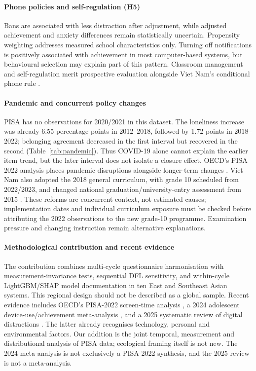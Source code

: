 \documentclass[preprint,12pt,authoryear,nonatbib]{elsarticle}
\let\citep\parencite
\begin{document}
\paragraph{Phone policies and self-regulation (H5)} Bans are associated with less distraction after adjustment, while adjusted achievement and anxiety differences remain statistically uncertain. Propensity weighting addresses measured school characteristics only. Turning off notifications is positively associated with achievement in most computer-based systems, but behavioural selection may explain part of this pattern. Classroom management and self-regulation merit prospective evaluation alongside Viet Nam's conditional phone rule \citep{moet2020circular32}.

\paragraph{Pandemic and concurrent policy changes} PISA has no observations for 2020/2021 in this dataset. The loneliness increase was already 6.55 percentage points in 2012--2018, followed by 1.72 points in 2018--2022; belonging agreement decreased in the first interval but recovered in the second (Table~\ref{tab:pandemic}). Thus COVID-19 alone cannot explain the earlier item trend, but the later interval does not isolate a closure effect. OECD's PISA 2022 analysis places pandemic disruptions alongside longer-term changes \citep{oecd2023vol2}. Viet Nam also adopted the 2018 general curriculum, with grade 10 scheduled from 2022/2023, and changed national graduation/university-entry assessment from 2015 \citep{moet2018curriculum,government2015exam}. These reforms are concurrent context, not estimated causes; implementation dates and individual curriculum exposure must be checked before attributing the 2022 observations to the new grade-10 programme. Examination pressure and changing instruction remain alternative explanations.

\paragraph{Methodological contribution and recent evidence} The contribution combines multi-cycle questionnaire harmonisation with measurement-invariance tests, sequential DFL sensitivity, and within-cycle LightGBM/SHAP model documentation in ten East and Southeast Asian systems. This regional design should not be described as a global sample. Recent evidence includes OECD's PISA-2022 screen-time analysis \citep{oecd2024screen}, a 2024 adolescent device-use/achievement meta-analysis \citep{wang2024}, and a 2025 systematic review of digital distractions \citep{martin2025}. The latter already recognises technology, personal and environmental factors. Our addition is the joint temporal, measurement and distributional analysis of PISA data; ecological framing itself is not new. The 2024 meta-analysis is not exclusively a PISA-2022 synthesis, and the 2025 review is not a meta-analysis.
\end{document}
